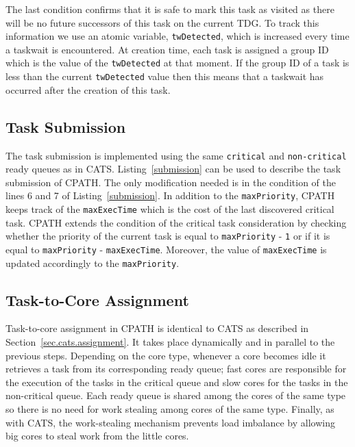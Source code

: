 The last condition confirms that it is safe to mark this task as visited as there will be no future successors of this task on the current TDG. 
To track this information we use an atomic variable, \texttt{twDetected}, which is increased every time a taskwait is encountered.
At creation time, each task is assigned a group ID which is the value of the \texttt{twDetected} at that moment.
If the group ID of a task is less than the current \texttt{twDetected} value then this means that a taskwait has occurred after the creation of this task.

\subsection{Task Submission} 
The task submission is implemented using the same \texttt{critical} and \texttt{non-critical} ready queues as in CATS.
Listing~\ref{submission} can be used to describe the task submission of CPATH.
The only modification needed is in the condition of the lines 6 and 7 of Listing~\ref{submission}.
In addition to the \texttt{maxPriority}, CPATH keeps track of the \texttt{maxExecTime} which is the cost of the last discovered critical task.
CPATH extends the condition of the critical task consideration by checking whether the priority of the current task is equal to \texttt{maxPriority} - \texttt{1} or if it is equal to \texttt{maxPriority} - \texttt{maxExecTime}.
Moreover, the value of \texttt{maxExecTime} is updated accordingly to the \texttt{maxPriority}.

\subsection{Task-to-Core Assignment}
Task-to-core assignment in CPATH is identical to CATS as described in Section~\ref{sec.cats.assignment}. 
It takes place dynamically and in parallel to the previous steps.
Depending on the core type, whenever a core becomes idle it retrieves a task from its corresponding ready queue; fast cores are responsible for the execution of the tasks in the critical queue and slow cores for the tasks in the non-critical queue.
Each ready queue is shared among the cores of the same type so there is no need for work stealing among cores of the same type. 
Finally, as with CATS, the work-stealing mechanism prevents load imbalance by allowing big cores to steal work from the little cores.




